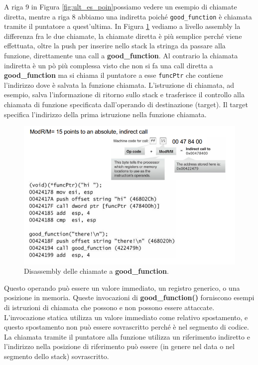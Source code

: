 A riga 9 in Figura \ref{fig:ult_es_poin}possiamo vedere un esempio di chiamate diretta, mentre a riga 8 abbiamo una indiretta poiché \verb|good_function| è chiamata tramite il puntatore a quest'ultima. In Figura \ref{fig:dissas_ult_es_poin} vediamo a livello assembly la differenza fra le due chiamate, la chiamate diretta è più semplice perché viene effettuata, oltre la push per inserire nello stack la stringa da passare alla funzione, direttamente una call a \textbf{good\_function}. Al contrario la chiamata indiretta è un pò più complessa visto che non si fa una call diretta a \textbf{good\_function} ma si chiama il puntatore a esse \verb|funcPtr| che contiene l'indirizzo dove è salvata la funzione chiamata. L'istruzione di chiamata, ad esempio, salva l'informazione di ritorno sullo stack e trasferisce il controllo alla chiamata di funzione specificata dall'operando di destinazione (target). Il target specifica l'indirizzo della prima istruzione nella funzione chiamata.
\begin{figure}[H] 
	\centering
    \includegraphics[width=12cm, keepaspectratio]{santini/img/cap_5/dissas_ult_es_point.png}
	\caption{Disassembly delle chiamate a \textbf{good\_function}.}\label{fig:dissas_ult_es_poin}
\end{figure}
 Questo operando può essere un valore immediato, un registro generico, o una posizione in memoria. Queste invocazioni di \textbf{good\_function()} forniscono esempi di istruzioni di chiamata che possono e non possono essere attaccate. L'invocazione statica utilizza un valore immediato come relativo spostamento, e questo spostamento non può essere sovrascritto perché è nel segmento di codice. La chiamata tramite il puntatore alla funzione utilizza un riferimento indiretto e l'indirizzo nella posizione di riferimento può essere (in genere nel data o nel segmento dello stack) sovrascritto.
